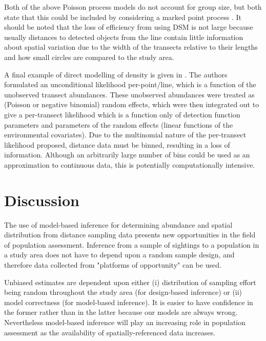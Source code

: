 \documentclass[a4paper,12pt]{article}
\begin{document}
Both of the above Poisson process models do not account for group size, but both state that this could be included by considering a marked point process \citep[Section 5.5]{cox1980point}. It should be noted that the loss of efficiency from using DSM is not large \citep[p. 313]{Buckland:2004ts} because usually distances to detected objects from the line contain little information about spatial variation due to the width of the transects relative to their lengths and how small circles are compared to the study area.

A final example of direct modelling of density is given in \cite{Royle:2004tu}. The authors formulated an unconditional likelihood per-point/line, which is a function of the unobserved transect abundances. These unobserved abundances were treated as (Poisson or negative binomial) random effects, which were then integrated out to give a per-transect likelihood which is a function only of detection function parameters and parameters of the random effects (linear functions of the environmental covariates). Due to the multinomial nature of the per-transect likelihood proposed, distance data must be binned, resulting in a loss of information. Although an arbitrarily large number of bins could be used as an approximation to continuous data, this is potentially computationally intensive.


\section*{Discussion}
\label{s:discussion}

The use of model-based inference for determining abundance and spatial distribution from distance sampling data presents new opportunities in the field of population assessment.   Inference from a sample of sightings to a population in a study area does not have to depend upon a random sample design, and therefore data collected from "platforms of opportunity" \citep{Williams:2006tz} can be used.

Unbiased estimates are dependent upon either (i) distribution of sampling effort being random throughout the study area (for design-based inference) or (ii) model correctness (for model-based inference).  It is easier to have confidence in the former rather than in the latter because our models are always wrong. Nevertheless model-based inference will play an increasing role in population assessment as the availability of spatially-referenced data increases.
\end{document}
